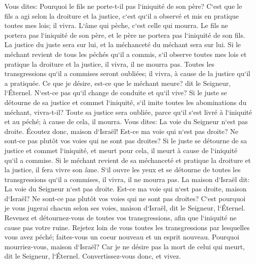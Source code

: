 \verse Vous dites: Pourquoi le fils ne porte-t-il pas l`iniquité de son père? C`est que le fils a agi selon la droiture et la justice, c`est qu`il a observé et mis en pratique toutes mes lois; il vivra. 
\verse L`âme qui pèche, c`est celle qui mourra. Le fils ne portera pas l`iniquité de son père, et le père ne portera pas l`iniquité de son fils. La justice du juste sera sur lui, et la méchanceté du méchant sera sur lui. 
\verse Si le méchant revient de tous les péchés qu`il a commis, s`il observe toutes mes lois et pratique la droiture et la justice, il vivra, il ne mourra pas. 
\verse Toutes les transgressions qu`il a commises seront oubliées; il vivra, à cause de la justice qu`il a pratiquée. 
\verse Ce que je désire, est-ce que le méchant meure? dit le Seigneur, l`Éternel. N`est-ce pas qu`il change de conduite et qu`il vive? 
\verse Si le juste se détourne de sa justice et commet l`iniquité, s`il imite toutes les abominations du méchant, vivra-t-il? Toute sa justice sera oubliée, parce qu`il s`est livré à l`iniquité et au péché; à cause de cela, il mourra. 
\verse Vous dites: La voie du Seigneur n`est pas droite. Écoutez donc, maison d`Israël! Est-ce ma voie qui n`est pas droite? Ne sont-ce pas plutôt vos voies qui ne sont pas droites? 
\verse Si le juste se détourne de sa justice et commet l`iniquité, et meurt pour cela, il meurt à cause de l`iniquité qu`il a commise. 
\verse Si le méchant revient de sa méchanceté et pratique la droiture et la justice, il fera vivre son âme. 
\verse S`il ouvre les yeux et se détourne de toutes les transgressions qu`il a commises, il vivra, il ne mourra pas. 
\verse La maison d`Israël dit: La voie du Seigneur n`est pas droite. Est-ce ma voie qui n`est pas droite, maison d`Israël? Ne sont-ce pas plutôt vos voies qui ne sont pas droites? 
\verse C`est pourquoi je vous jugerai chacun selon ses voies, maison d`Israël, dit le Seigneur, l`Éternel. Revenez et détournez-vous de toutes vos transgressions, afin que l`iniquité ne cause pas votre ruine. 
\verse Rejetez loin de vous toutes les transgressions par lesquelles vous avez péché; faites-vous un coeur nouveau et un esprit nouveau. Pourquoi mourriez-vous, maison d`Israël? 
\verse Car je ne désire pas la mort de celui qui meurt, dit le Seigneur, l`Éternel. Convertissez-vous donc, et vivez. 

\chapter{}

